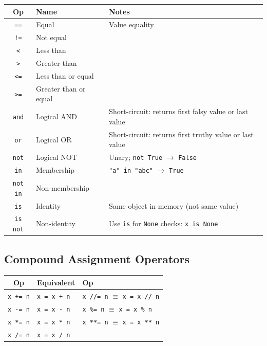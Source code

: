\documentclass[oneside]{book}
\begin{document}
\begin{center}
\begin{tabularx}{\linewidth}{clX}
\toprule
\textbf{Op} & \textbf{Name} & \textbf{Notes} \\
\midrule
\texttt{==}     & Equal              & Value equality \\
\texttt{!=}     & Not equal          & \\
\texttt{<}      & Less than          & \\
\texttt{>}      & Greater than       & \\
\texttt{<=}     & Less than or equal & \\
\texttt{>=}     & Greater than or equal & \\
\texttt{and}    & Logical AND        & Short-circuit: returns first falsy value or last value \\
\texttt{or}     & Logical OR         & Short-circuit: returns first truthy value or last value \\
\texttt{not}    & Logical NOT        & Unary; \texttt{not True} $\to$ \texttt{False} \\
\texttt{in}     & Membership         & \texttt{"a" in "abc"} $\to$ \texttt{True} \\
\texttt{not in} & Non-membership     & \\
\texttt{is}     & Identity           & Same object in memory (not same value) \\
\texttt{is not} & Non-identity       & Use \texttt{is} for \texttt{None} checks: \texttt{x is None} \\
\bottomrule
\end{tabularx}
\end{center}

\subsection*{Compound Assignment Operators}

\begin{center}
\begin{tabular}{cll}
\toprule
\textbf{Op} & \textbf{Equivalent} & \textbf{Op} \\
\midrule
\texttt{x += n}  & \texttt{x = x + n}  & \texttt{x //= n} \; $\equiv$ \; \texttt{x = x // n} \\
\texttt{x -= n}  & \texttt{x = x - n}  & \texttt{x \%= n} \; $\equiv$ \; \texttt{x = x \% n} \\
\texttt{x *= n}  & \texttt{x = x * n}  & \texttt{x **= n} \; $\equiv$ \; \texttt{x = x ** n} \\
\texttt{x /= n}  & \texttt{x = x / n}  & \\
\bottomrule
\end{tabular}
\end{center}
\end{document}
